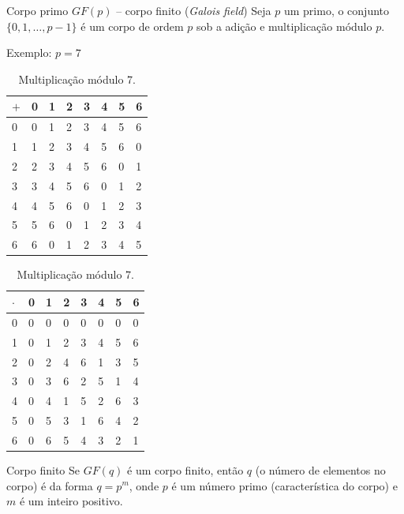 \begin{frame}[allowframebreaks]
\framebreak
\begin{block}{Corpo primo $GF(p)$ -- corpo finito (\emph{Galois field})}
  Seja $p$ um primo, o conjunto $\{0,1,\ldots,p-1\}$ é um corpo de ordem $p$ sob a
  adição e multiplicação módulo $p$.
\end{block}

Exemplo: $p=7$
\begin{table}[!htb]
    \begin{minipage}{.5\linewidth}
      \caption{Adicção módulo 7.}
      \centering
        \begin{tabular}{l|lllllll}
          $+$ & 0 & 1 & 2 & 3 & 4 & 5 & 6 \\
          \hline
          0 & 0 & 1 & 2 & 3 & 4 & 5 & 6 \\
          1 & 1 & 2 & 3 & 4 & 5 & 6 & 0 \\
          2 & 2 & 3 & 4 & 5 & 6 & 0 & 1 \\
          3 & 3 & 4 & 5 & 6 & 0 & 1 & 2 \\
          4 & 4 & 5 & 6 & 0 & 1 & 2 & 3 \\
          5 & 5 & 6 & 0 & 1 & 2 & 3 & 4 \\
          6 & 6 & 0 & 1 & 2 & 3 & 4 & 5
        \end{tabular}
    \end{minipage}%
    \begin{minipage}{.5\linewidth}
      \centering
        \caption{Multiplicação módulo 7.}
        \begin{tabular}{l|lllllll}
        $\cdot$ & 0 & 1 & 2 & 3 & 4 & 5 & 6 \\
        \hline
        0 & 0 & 0 & 0 & 0 & 0 & 0 & 0 \\
        1 & 0 & 1 & 2 & 3 & 4 & 5 & 6 \\
        2 & 0 & 2 & 4 & 6 & 1 & 3 & 5 \\
        3 & 0 & 3 & 6 & 2 & 5 & 1 & 4 \\
        4 & 0 & 4 & 1 & 5 & 2 & 6 & 3 \\
        5 & 0 & 5 & 3 & 1 & 6 & 4 & 2 \\
        6 & 0 & 6 & 5 & 4 & 3 & 2 & 1
        \end{tabular}
    \end{minipage} 
\end{table}

\framebreak

\begin{block}{Corpo finito}
  Se $GF(q)$ é um corpo finito, então $q$ (o número de elementos no corpo) é da forma $q = p^m$, onde
  $p$ é um número primo (característica do corpo) e $m$ é um inteiro positivo.


\end{block}
\end{frame}

